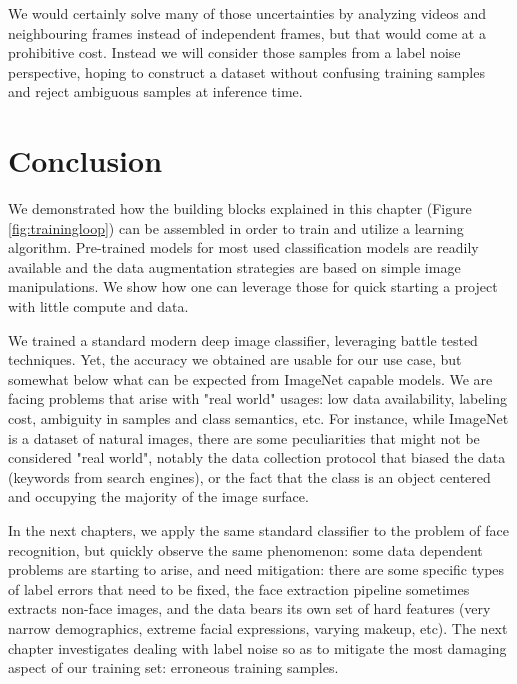 We would certainly solve many of those uncertainties by analyzing videos and neighbouring frames instead of independent frames, but that would come at a prohibitive cost. Instead we will consider those samples from a label noise perspective, hoping to construct a dataset without confusing training samples and reject ambiguous samples at inference time.

\section{Conclusion}

We demonstrated how the building blocks explained in this chapter (Figure \ref{fig:trainingloop}) can be assembled in order to train and utilize a learning algorithm. Pre-trained models for most used classification models are readily available and the data augmentation strategies are based on simple image manipulations. We show how one can leverage those for quick starting a project with little compute and data.

We trained a standard modern deep image classifier, leveraging battle tested techniques. Yet, the accuracy we obtained are usable for our use case, but somewhat below what can be expected from ImageNet capable models. We are facing problems that arise with "real world" usages: low data availability, labeling cost, ambiguity in samples and class semantics, etc. For instance, while ImageNet is a dataset of natural images, there are some peculiarities that might not be considered "real world", notably the data collection protocol that biased the data (keywords from search engines), or the fact that the class is an object centered and occupying the majority of the image surface.

In the next chapters, we apply the same standard classifier to the problem of face recognition, but quickly observe the same phenomenon: some data dependent problems are starting to arise, and need mitigation: there are some specific types of label errors that need to be fixed, the face extraction pipeline sometimes extracts non-face images, and the data bears its own set of hard features (very narrow demographics, extreme facial expressions, varying makeup, etc). The next chapter investigates dealing with label noise so as to mitigate the most damaging aspect of our training set: erroneous training samples.